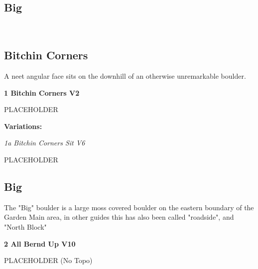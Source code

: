 \begin{multicols}{2}
		\section{Big}\label{sa:Big}
	\begin{minipage}{\columnwidth}
	\
	\end{minipage}
			\subsection*{Bitchin Corners}\label{bf:Bitchin Corners}
			\begin{minipage}{\columnwidth}
			A neet angular face sits on the downhill of an otherwise unremarkable boulder.
			\end{minipage}
			

					\begin{minipage}{\linewidth}	
					\label{rt:Bitchin Corners}\colorbox{green!20}{\textbf{1 Bitchin Corners V2  }}
					\begin{adjustwidth}{0.5cm}{}				
					PLACEHOLDER
					\end{adjustwidth}
					\end{minipage}
						\begin{adjustwidth}{0.5cm}{}				
						\textbf{Variations:} \newline
							\begin{minipage}{\linewidth}	
							\label{vr:Bitchin Corners Sit}\colorbox{RoyalBlue!20}{\emph{1a Bitchin Corners Sit V6  }}
							\begin{adjustwidth}{0.5cm}{}				
							PLACEHOLDER
							\end{adjustwidth}
							\end{minipage}
						\end{adjustwidth}
			\subsection*{Big}\label{bf:Big}
			\begin{minipage}{\columnwidth}
			The "Big" boulder is a large moss covered boulder on the eastern boundary of the Garden Main area, in other guides this has also been called "roadside", and "North Block"
			\end{minipage}
			
					\begin{minipage}{\linewidth}	
					\label{rt:All Bernd Up}\colorbox{red!20}{\textbf{2 All Bernd Up V10  }}
					\begin{adjustwidth}{0.5cm}{}				
					PLACEHOLDER
						\newline (No Topo) 
					\end{adjustwidth}
					\end{minipage}

\end{multicols}
